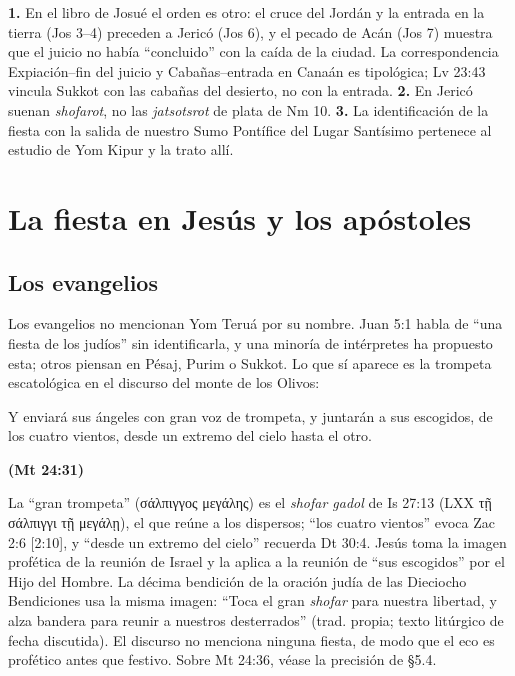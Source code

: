 \documentclass[11pt,letterpaper]{article}
\newcommand{\grc}[1]{\foreignlanguage{ancientgreek}{#1}}
\newcommand{\fuente}[1]{\par\hfill{\upshape\bfseries\small\textcolor{tierraroja}{#1}}}
\begin{document}
\begin{nota}
\textbf{1.} En el libro de Josué el orden es otro: el cruce del Jordán y la entrada en la tierra (Jos 3--4) preceden a Jericó (Jos 6), y el pecado de Acán (Jos 7) muestra que el juicio no había ``concluido'' con la caída de la ciudad. La correspondencia Expiación--fin del juicio y Cabañas--entrada en Canaán es tipológica; Lv 23:43 vincula Sukkot con las cabañas del desierto, no con la entrada. \textbf{2.} En Jericó suenan \emph{shofarot}, no las \emph{jatsotsrot} de plata de Nm 10. \textbf{3.} La identificación de la fiesta con la salida de nuestro Sumo Pontífice del Lugar Santísimo pertenece al estudio de Yom Kipur y la trato allí.
\end{nota}

\section{La fiesta en Jesús y los apóstoles}

\subsection{Los evangelios}
Los evangelios no mencionan Yom Teruá por su nombre. Juan 5:1 habla de ``una fiesta de los judíos'' sin identificarla, y una minoría de intérpretes ha propuesto esta; otros piensan en Pésaj, Purim o Sukkot. Lo que sí aparece es la trompeta escatológica en el discurso del monte de los Olivos:

\begin{cita}Y enviará sus ángeles con gran voz de trompeta, y juntarán a sus escogidos, de los cuatro vientos, desde un extremo del cielo hasta el otro.\fuente{(Mt 24:31)}\end{cita}

La ``gran trompeta'' (\grc{σάλπιγγος μεγάλης}) es el \emph{shofar gadol} de Is 27:13 (LXX \grc{τῇ σάλπιγγι τῇ μεγάλῃ}), el que reúne a los dispersos; ``los cuatro vientos'' evoca Zac 2:6 [2:10], y ``desde un extremo del cielo'' recuerda Dt 30:4. Jesús toma la imagen profética de la reunión de Israel y la aplica a la reunión de ``sus escogidos'' por el Hijo del Hombre. La décima bendición de la oración judía de las Dieciocho Bendiciones usa la misma imagen: ``Toca el gran \emph{shofar} para nuestra libertad, y alza bandera para reunir a nuestros desterrados'' (trad. propia; texto litúrgico de fecha discutida). El discurso no menciona ninguna fiesta, de modo que el eco es profético antes que festivo. Sobre Mt 24:36, véase la precisión de §5.4.
\end{document}
